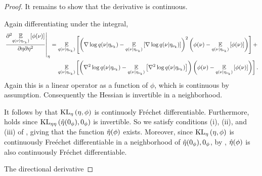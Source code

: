 \begin{thm}
\begin{proof}
It remains to show that the derivative is continuous.


Again differentiating under the integral,
%
\begin{align*}
%
\fracat{\partial^2 \expect{\q(\nu \vert \etanuk)}
              {\phi(\nu)}}{\partial \eta \partial \eta^2}{\eta} ={}&
\expect{\q(\nu \vert \etanuk)}
       {\left(\nabla \log \q(\nu \vert \etanuk)
         - \expect{\q(\nu \vert \etanuk)}
                  {\nabla \log \q(\nu \vert \etanuk)}
       \right)^2
       \left( \phi(\nu) - \expect{\q(\nu \vert \etanuk)}{\phi(\nu)} \right)} +
\\&
\expect{\q(\nu \vert \etanuk)}{
       \left(                            \nabla^2 \log \q(\nu \vert \etanuk)
        - \expect{\q(\nu \vert \etanuk)}{\nabla^2 \log \q(\nu \vert \etanuk)}
       \right)
       \left( \phi(\nu) - \expect{\q(\nu \vert \etanuk)}{\phi(\nu)} \right)
       }.
%
\end{align*}
%
Again this is a linear operator as a function of $\phi$, which is continuous by
assumption.  Consequently the Hessian is invertible in a neighborhood.

It follows by \citet[Proposition 4.14(c)]{zeidler:2013:functional} that
$\mathrm{KL}_{\eta}\left(\eta, \phi\right)$ is continuosly Fr{\'e}chet differentiable.  Furthermore,
\citet[Chapter 4 Condition 21b]{zeidler:2013:functional} holds since
$\mathrm{KL}_{\eta\eta}\left(\hat\eta(0_\phi), 0_\phi\right)$ is invertible.  So we satisfy conditions (i),
(ii), and (iii) of \citet[Theorem 4.B(c)]{zeidler:2013:functional}, giving that
the function $\hat\eta(\phi)$ exists.  Moreover, since $\mathrm{KL}_{\eta}\left(\eta, \phi\right)$ is
continuously Fre{\'e}chet differentiable in a neighborhood of $\hat\eta(0_\phi),
0_\phi$, by \citet[Theorem 4.B(d)]{zeidler:2013:functional}, $\hat\eta(\phi)$ is
also continuously Fr{\'e}chet differentiable.

The directional derivative

%
\end{proof}
%
\end{thm}
%
